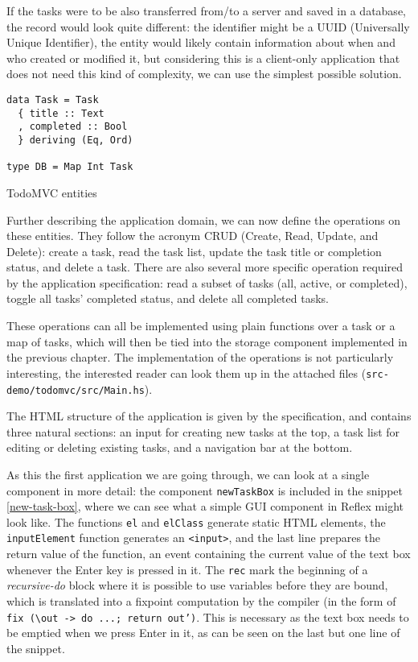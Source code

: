 \documentclass[english,odsaz]{fitthesis}
\begin{document}
If the tasks were to be also transferred from/to a server and saved in a
database, the record would look quite different: the identifier might be a UUID
(Universally Unique Identifier), the entity would likely contain information
about when and who created or modified it, but considering this is a client-only
application that does not need this kind of complexity, we can use the simplest
possible solution.

\begin{listing}[htbp]
\begin{verbatim}
data Task = Task
  { title :: Text
  , completed :: Bool
  } deriving (Eq, Ord)

type DB = Map Int Task
\end{verbatim}
\caption{TodoMVC entities \label{todomvc-entities}}
\end{listing}

Further describing the application domain, we can now define the operations on
these entities. They follow the acronym CRUD (Create, Read, Update, and Delete):
create a task, read the task list, update the task title or completion status,
and delete a task. There are also several more specific operation required by
the application specification: read a subset of tasks (all, active, or
completed), toggle all tasks' completed status, and delete all completed tasks.

These operations can all be implemented using plain functions over a task or a
map of tasks, which will then be tied into the storage component implemented in
the previous chapter. The implementation of the operations is not particularly
interesting, the interested reader can look them up in the attached files
(\texttt{src-demo/todomvc/src/Main.hs}).

The HTML structure of the application is given by the specification, and
contains three natural sections: an input for creating new tasks at the top, a
task list for editing or deleting existing tasks, and a navigation bar at the
bottom.

As this the first application we are going through, we can look at a single
component in more detail: the component \texttt{newTaskBox} is included in the snippet
\ref{new-task-box}, where we can see what a simple GUI component in Reflex might
look like. The functions \texttt{el} and \texttt{elClass} generate static HTML elements, the
\texttt{inputElement} function generates an \texttt{<input>}, and the last line prepares the
return value of the function, an event containing the current value of the text
box whenever the Enter key is pressed in it. The \texttt{rec} mark the beginning of a
\emph{recursive-do} block where it is possible to use variables before they are bound,
which is translated into a fixpoint computation by the compiler (in the form of
\texttt{fix (\textbackslash{}out -> do ...; return out')}. This is necessary as the text box needs to be
emptied when we press Enter in it, as can be seen on the last but one line of
the snippet.
\end{document}
